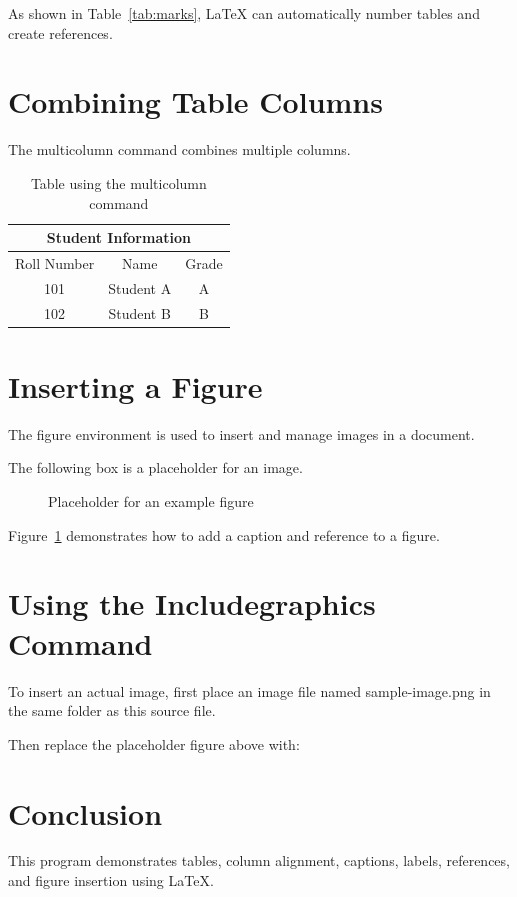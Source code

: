 \documentclass[12pt,a4paper]{article}
\begin{document}
As shown in Table~\ref{tab:marks}, LaTeX can
automatically number tables and create references.

\section{Combining Table Columns}

The multicolumn command combines multiple columns.

\begin{table}[htbp]
\centering
\begin{tabular}{|c|c|c|}
\hline
\multicolumn{3}{|c|}{Student Information} \\
\hline
Roll Number & Name & Grade \\
\hline
101 & Student A & A \\
102 & Student B & B \\
\hline
\end{tabular}
\caption{Table using the multicolumn command}
\label{tab:multicolumn}
\end{table}

\section{Inserting a Figure}

The figure environment is used to insert and manage
images in a document.

The following box is a placeholder for an image.

\begin{figure}[htbp]
\centering
\fbox{\rule{0pt}{4cm}\rule{0.75\linewidth}{0pt}}
\caption{Placeholder for an example figure}
\label{fig:placeholder}
\end{figure}

Figure~\ref{fig:placeholder} demonstrates how to
add a caption and reference to a figure.

\section{Using the Includegraphics Command}

To insert an actual image, first place an image file
named sample-image.png in the same folder as this
source file.

Then replace the placeholder figure above with:


\section{Conclusion}

This program demonstrates tables, column alignment,
captions, labels, references, and figure insertion
using LaTeX.
\end{document}
